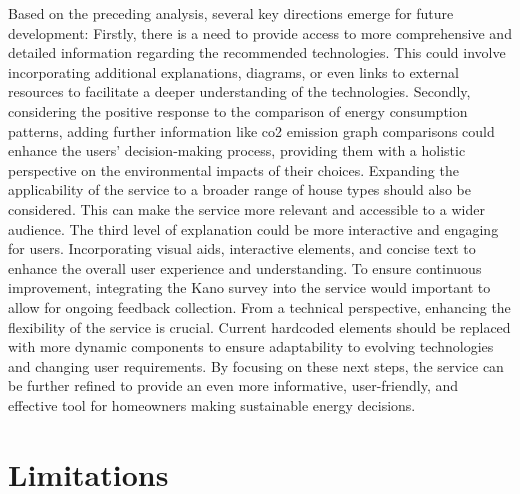 Based on the preceding analysis, several key directions emerge for future development:
Firstly, there is a need to provide access to more comprehensive and detailed information regarding the recommended technologies. This could involve incorporating additional explanations, diagrams, or even links to external resources to facilitate a deeper understanding of the technologies.
Secondly, considering the positive response to the comparison of energy consumption patterns, adding further information like \gls{co2} emission graph comparisons could enhance the users' decision-making process, providing them with a holistic perspective on the environmental impacts of their choices.
Expanding the applicability of the service to a broader range of house types should also be considered. This can make the service more relevant and accessible to a wider audience. 
The third level of explanation could be more interactive and engaging for users. Incorporating visual aids, interactive elements, and concise text to enhance the overall user experience and understanding.
To ensure continuous improvement, integrating the Kano survey into the service would important to allow for ongoing feedback collection. 
From a technical perspective, enhancing the flexibility of the service is crucial. Current hardcoded elements should be replaced with more dynamic components to ensure adaptability to evolving technologies and changing user requirements. 
By focusing on these next steps, the service can be further refined to provide an even more informative, user-friendly, and effective tool for homeowners making sustainable energy decisions.


\section{Limitations}

